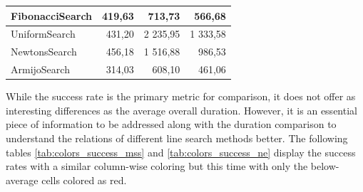 \documentclass[a4paper,english,titlepage,12pt]{article}
\begin{document}
\begin{table}[H]
\begin{tabular}{|l|r|r|r|}
    FibonacciSearch                                                           & 419,63                                                    & \cellcolor[HTML]{C9E9D9}713,73                           & \cellcolor[HTML]{A5DABF}566,68                                \\ \hline
    UniformSearch                                                             & 431,20                                                    & \cellcolor[HTML]{E67B73}2 235,95                         & \cellcolor[HTML]{EDA19C}1 333,58                              \\ \hline
    NewtonsSearch                                                             & 456,18                                                    & \cellcolor[HTML]{EDA19C}1 516,88                         & \cellcolor[HTML]{F7D3D0}986,53                                \\ \hline
    ArmijoSearch                                                              & \cellcolor[HTML]{57BB89}314,03                            & \cellcolor[HTML]{57BB89}608,10                           & \cellcolor[HTML]{57BB89}461,06                                \\ \hline
    \end{tabular}
\end{table}


While the success rate is the primary metric for comparison, it does not offer as interesting differences as the average overall duration. However, it is an essential piece of information to be addressed along with the duration comparison to understand the relations of different line search methods better. The following tables \ref{tab:colors_success_mss} and \ref{tab:colors_success_ne} display the success rates with a similar column-wise coloring but this time with only the below-average cells colored as red.
\end{document}
